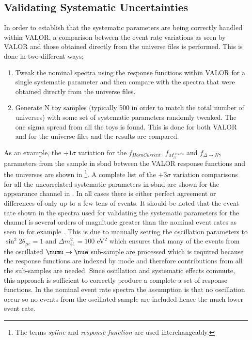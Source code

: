 \subsection{Validating Systematic Uncertainties}
In order to establish that the systematic parameters are being correctly handled within VALOR, a comparison between the event rate variations as seen by VALOR and those obtained directly from the universe files is performed. This is done in two different ways; 
\begin{enumerate}
    \item Tweak the nominal spectra using the response functions within VALOR for a single systematic parameter and then compare with the spectra that were obtained directly from the universe files.
    \item Generate N toy samples (typically 500 in order to match the total number of universes) with some set of systematic parameters randomly tweaked. The one sigma spread from all the toys is found. This is done for both VALOR and for the universe files and the results are compared. 
\end{enumerate}

As an example, the $+1\sigma$ variation for the $f_{HornCurrent}$, $f_{M_A^{CCRes}}$ and $f_{\Delta \rightarrow N \gamma}$ parameters from the \nue sample in \gls{sbnd} between the VALOR response functions and the universes are shown in \footnote{The terms \textit{spline} and \textit{response function} are used interchangeably.}. A complete list of the $+3\sigma$ variation comparisons for all the uncorrelated systematic parameters in \gls{sbnd} are shown for the \nue appearance channel in . In all cases there is either perfect agreement or differences of only up to a few tens of events. It should be noted that the event rate shown in the spectra used for validating the systematic parameters for the \nue channel is several orders of magnitude greater than the nominal event rates as seen in for example . This is due to manually setting the oscillation parameters to $\sin^2{2\theta_{\mu e}} = 1$ and $\Delta m_{41}^2 = 100$ eV$^2$ which ensures that many of the events from the oscillated $\numu \rightarrow \nue$ sub-sample are processed which is required because the response functions are indexed by mode and therefore contributions from all the sub-samples are needed. Since oscillation and systematic effects commute, this approach is sufficient to correctly produce a complete a set of response functions. In the nominal event rate spectra the assumption is that no oscillation occur so no events from the oscillated sample are included hence the much lower event rate. 

